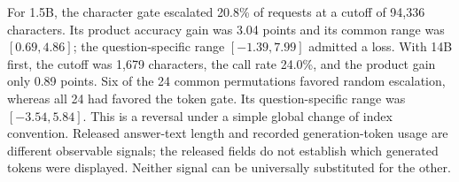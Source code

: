 For 1.5B, the character gate escalated 20.8\% of requests at a cutoff of 94,336 characters. Its product accuracy gain was 3.04 points and its common range was $[0.69,4.86]$; the question-specific range $[-1.39,7.99]$ admitted a loss. With 14B first, the cutoff was 1,679 characters, the call rate 24.0\%, and the product gain only 0.89 points. Six of the 24 common permutations favored random escalation, whereas all 24 had favored the token gate. Its question-specific range was $[-3.54,5.84]$. This is a reversal under a simple global change of index convention. Released answer-text length and recorded generation-token usage are different observable signals; the released fields do not establish which generated tokens were displayed. Neither signal can be universally substituted for the other.
